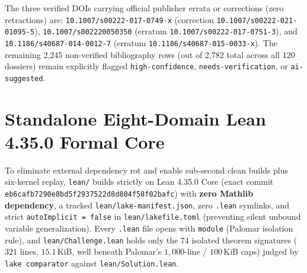 \documentclass[11pt,reqno]{amsart}
\def\UrlBreaks{\do\.\do\/\do\-\do\_\do\:\do\=\do\,\do\{\do\}}
\theoremstyle{plain}
\theoremstyle{definition}
\newcommand{\code}[1]{{\upshape\nolinkurl{#1}}}
\newcommand{\hashcode}[1]{{\upshape\def\UrlBreaks{\do\:\do 0\do 1\do 2\do 3\do 4\do 5\do 6\do 7\do 8\do 9\do a\do b\do c\do d\do e\do f\do h\do n\do p\do s\do w}\nolinkurl{#1}}}
\begin{document}
The three verified DOIs carrying official publisher errata or corrections (zero retractions) are:
\code{10.1007/s00222-017-0749-x} (correction \code{10.1007/s00222-021-01095-5}),
\code{10.1007/s002220050350} (erratum \code{10.1007/s00222-017-0751-3}), and
\code{10.1186/s40687-014-0012-7} (erratum \code{10.1186/s40687-015-0033-x}).
The remaining 2,245 non-verified bibliography rows (out of 2,782 total across all 120 dossiers)
remain explicitly flagged \code{high-confidence}, \code{needs-verification}, or \code{ai-suggested}.

\section{Standalone Eight-Domain Lean 4.35.0 Formal Core}\label{sec:lean}

To eliminate external dependency rot and enable sub-second clean builds plus six-kernel replay,
\code{lean/} builds strictly on Lean 4.35.0 Core \cite{demoura2021lean4} (exact commit
\hashcode{eb6cafb7290e8bd5f2937522d8d804f58f02bafc}) with \textbf{zero Mathlib dependency}, a
tracked \code{lean/lake-manifest.json}, zero \code{.lean} symlinks, and strict
\code{autoImplicit = false} in \code{lean/lakefile.toml} (preventing silent unbound variable
generalization). Every \code{.lean} file opens with \code{module} (Palomar isolation rule), and
\code{lean/Challenge.lean} holds only the 74 isolated theorem signatures ($321$ lines,
$15.1$\,KiB, well beneath Palomar's $1{,}000$-line / $100$\,KiB caps) judged by
\code{lake comparator} against \code{lean/Solution.lean}.
\end{document}
